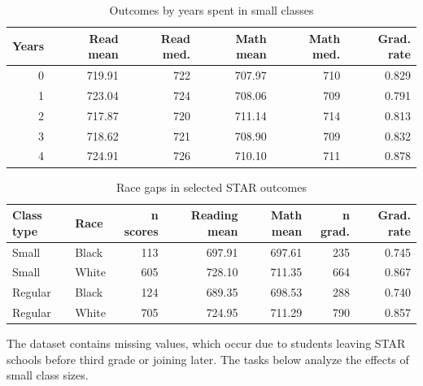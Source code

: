 \documentclass[12pt]{article}
\begin{document}
\begin{table}[H]
\centering
\caption{Outcomes by years spent in small classes}\label{tab:star-years-outcomes}
\begin{tabular}{rrrrrr}
\toprule
\textbf{Years} & \textbf{Read mean} & \textbf{Read med.} & \textbf{Math mean} & \textbf{Math med.} & \textbf{Grad. rate} \\
\midrule
0 & 719.91 & 722 & 707.97 & 710 & 0.829 \\
1 & 723.04 & 724 & 708.06 & 709 & 0.791 \\
2 & 717.87 & 720 & 711.14 & 714 & 0.813 \\
3 & 718.62 & 721 & 708.90 & 709 & 0.832 \\
4 & 724.91 & 726 & 710.10 & 711 & 0.878 \\
\bottomrule
\end{tabular}
\end{table}

\begin{table}[H]
\centering
\caption{Race gaps in selected STAR outcomes}\label{tab:star-race-gaps}
\begin{tabular}{llrrrrr}
\toprule
\textbf{Class type} & \textbf{Race} & \textbf{n scores} & \textbf{Reading mean} & \textbf{Math mean} & \textbf{n grad.} & \textbf{Grad. rate} \\
\midrule
Small & Black & 113 & 697.91 & 697.61 & 235 & 0.745 \\
Small & White & 605 & 728.10 & 711.35 & 664 & 0.867 \\
Regular & Black & 124 & 689.35 & 698.53 & 288 & 0.740 \\
Regular & White & 705 & 724.95 & 711.29 & 790 & 0.857 \\
\bottomrule
\end{tabular}
\end{table}

The dataset contains missing values, which occur due to students leaving STAR schools before third grade or joining later. The tasks below analyze the effects of small class sizes.
\end{document}
